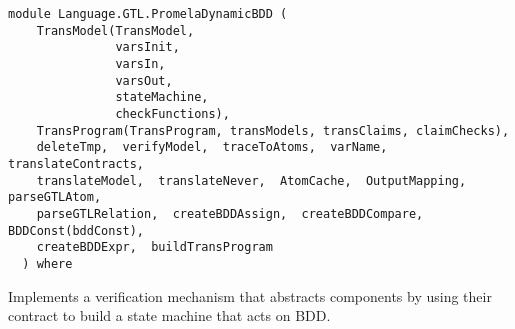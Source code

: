 \label{module:Language.GTL.PromelaDynamicBDD}
\haddockbeginheader
{\haddockverb\begin{verbatim}
module Language.GTL.PromelaDynamicBDD (
    TransModel(TransModel,
               varsInit,
               varsIn,
               varsOut,
               stateMachine,
               checkFunctions), 
    TransProgram(TransProgram, transModels, transClaims, claimChecks), 
    deleteTmp,  verifyModel,  traceToAtoms,  varName,  translateContracts, 
    translateModel,  translateNever,  AtomCache,  OutputMapping,  parseGTLAtom, 
    parseGTLRelation,  createBDDAssign,  createBDDCompare,  BDDConst(bddConst), 
    createBDDExpr,  buildTransProgram
  ) where\end{verbatim}}
\haddockendheader

Implements a verification mechanism that abstracts components by using their
    contract to build a state machine that acts on BDD.
\par


